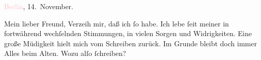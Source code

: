 \pstart
           \textcolor{pink}{Berlin}{}\ledrightnote{\textcolor{pink}{Berlin}}, 14. November.\pend
           
\pstart\center{}Mein lieber Freund,\pend
\pstart
           Verzeih mir, daß ich ſo \label{K_L03388-1v}\label{K_L03388-1h} habe. Ich
               lebe ſeit meiner \label{K_L03388-2v}\label{K_L03388-2h} in
               fortwährend wechſelnden Stimmungen, in vielen Sorgen und Widrigkeiten. Eine große
               Müdigkeit hielt mich vom Schreiben zurück. Im Grunde  bleibt doch immer Alles beim Alten. Wozu alſo ſchreiben?\pend
           
